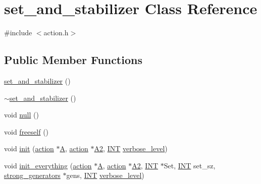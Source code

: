 \hypertarget{classset__and__stabilizer}{}\section{set\+\_\+and\+\_\+stabilizer Class Reference}
\label{classset__and__stabilizer}


{\ttfamily \#include $<$action.\+h$>$}

\subsection*{Public Member Functions}
\begin{DoxyCompactItemize}
\item 
\mbox{\hyperlink{classset__and__stabilizer_a3874b55426db380af242fcd3f75fbc34}{set\+\_\+and\+\_\+stabilizer}} ()
\item 
\mbox{\hyperlink{classset__and__stabilizer_a81839e1899f804e68f8ec45955a7d718}{$\sim$set\+\_\+and\+\_\+stabilizer}} ()
\item 
void \mbox{\hyperlink{classset__and__stabilizer_a12200f44a3715b3bd07970fc4cedbc6b}{null}} ()
\item 
void \mbox{\hyperlink{classset__and__stabilizer_a5be7372aa149d76d3d15aba5d12b1e48}{freeself}} ()
\item 
void \mbox{\hyperlink{classset__and__stabilizer_a9824acdea41591e8086e76aa8b2e4b53}{init}} (\mbox{\hyperlink{classaction}{action}} $\ast$\mbox{\hyperlink{classset__and__stabilizer_a01e42608b1227afa8f50b8c779a70631}{A}}, \mbox{\hyperlink{classaction}{action}} $\ast$\mbox{\hyperlink{classset__and__stabilizer_ac955d7310c2a85963290539b5f7b3b6f}{A2}}, \mbox{\hyperlink{galois_8h_a09fddde158a3a20bd2dcadb609de11dc}{I\+NT}} \mbox{\hyperlink{simeon_8_c_a818073fbcc2f439e7c56952f67386122}{verbose\+\_\+level}})
\item 
void \mbox{\hyperlink{classset__and__stabilizer_af069e038d8a67a93a89f05a690ca4b04}{init\+\_\+everything}} (\mbox{\hyperlink{classaction}{action}} $\ast$\mbox{\hyperlink{classset__and__stabilizer_a01e42608b1227afa8f50b8c779a70631}{A}}, \mbox{\hyperlink{classaction}{action}} $\ast$\mbox{\hyperlink{classset__and__stabilizer_ac955d7310c2a85963290539b5f7b3b6f}{A2}}, \mbox{\hyperlink{galois_8h_a09fddde158a3a20bd2dcadb609de11dc}{I\+NT}} $\ast$Set, \mbox{\hyperlink{galois_8h_a09fddde158a3a20bd2dcadb609de11dc}{I\+NT}} set\+\_\+sz, \mbox{\hyperlink{classstrong__generators}{strong\+\_\+generators}} $\ast$gens, \mbox{\hyperlink{galois_8h_a09fddde158a3a20bd2dcadb609de11dc}{I\+NT}} \mbox{\hyperlink{simeon_8_c_a818073fbcc2f439e7c56952f67386122}{verbose\+\_\+level}})

\end{DoxyCompactItemize}
